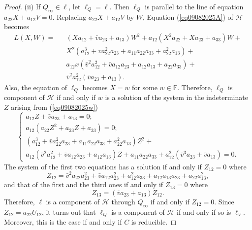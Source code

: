\documentclass[sn-mathphys-num]{sn-jnl}%
\begin{document}
\begin{proof}
(ii) If $Q_\infty \in \ell$, let $\ell_Q=\ell$. Then $\ell_Q$ is parallel to the line  of equation $a_{22}X+a_{12}V=0$. Replacing $a_{22}X+a_{12}V$ by $W$, Equation (\ref{eq09082025A}) of $\mathcal{H}$ becomes
\begin{equation}
\label{eq09082025w}
\begin{array}{llll}L(X,W)=&&(Xa_{12}+\bar{v}a_{23}+a_{13})W^2+a_{12}(X^2a_{22}+Xa_{23}+a_{33})W+\\
&&X^2(a_{12}^3+\bar{v}a_{22}^2a_{23}+a_{11}a_{22}a_{33}+a_{22}^2a_{13})+\\
&&a_{12}x(\bar{v}^2a_{12}^2+\bar{v}a_{12}a_{23}+a_{12}a_{13}+a_{22}a_{33})+\\
&& \bar{v}^2a_{12}^2(\bar{v}a_{23}+a_{13}).
\end{array}
\end{equation}
Also, the equation of $\ell_Q$ becomes $X=w$ for some $w\in \mathbb{F}$.
Therefore, $\ell_Q$ is component of $\mathcal{H}$ if and only if $w$ is a solution of the system in the indeterminate $Z$ arising from (\ref{eq09082025w})
\begin{equation}
\label{eq09082025WW}
\begin{cases}
a_{12}Z+\bar{v}a_{23}+a_{13}=0;\\
a_{12}(a_{22}Z^2+a_{23}Z+a_{33})=0;\\
(a_{12}^3+\bar{v}a_{22}^2a_{23}+a_{11}a_{22}a_{33}+a_{22}^2a_{13})
Z^2+\\
a_{12}(\bar{v}^2a_{12}^2+\bar{v}a_{12}a_{23}+a_{12}a_{13})Z+a_{11}a_{22}a_{33}+
a_{12}^2(\bar{v}^3a_{23}+\bar{v}a_{13})=0.
\end{cases}
\end{equation}
The system of the first two equations has a solution if and only if
$Z_{12}=0$ where
\begin{equation}
\label{eq12082025B}
Z_{12}=\bar{v}^2a_{22}a_{23}^2+\bar{v}a_{12}a_{23}^2+a_{12}^2a_{33}+a_{12}a_{13}a_{23}+a_{22}a_{13}^2,
\end{equation}
and that of the first and the third ones if and only if $Z_{13}=0$ where
\begin{equation}
\label{eq12082025BB}
Z_{13}=(\bar{v}a_{23}+a_{13})Z_{12}.
\end{equation}
Therefore, $\ell$ is a component of $\mathcal{H}$ through $Q_\infty$ if and only if $Z_{12}=0$. Since $Z_{12}=a_{22}U_{12}$, it turns out that
$\ell_Q$ is a component of $\mathcal{H}$ if and only if so is $\ell_V$. Moreover, this is the case if and only if $C$ is reducible.


\end{proof}
\end{document}
